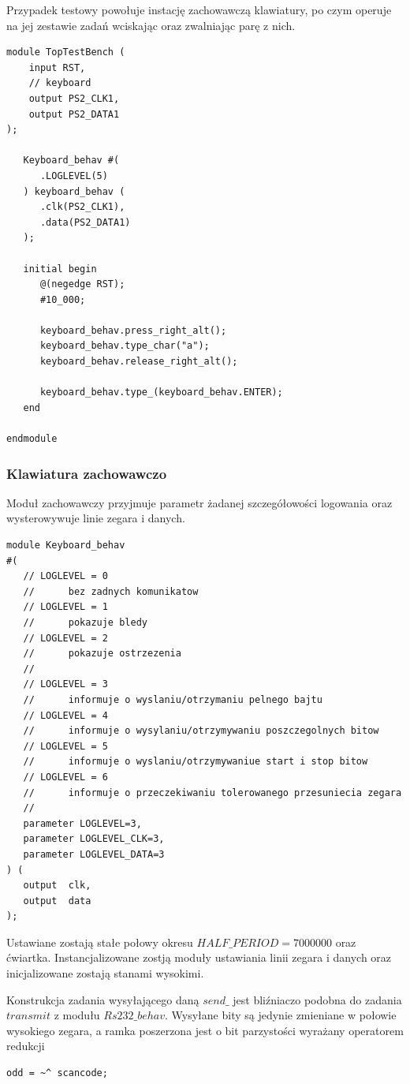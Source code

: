 \documentclass[a4paper,12pt]{article}
\begin{document}
Przypadek testowy powołuje instację zachowawczą klawiatury, po czym operuje na jej zestawie zadań wciskając oraz zwalniając parę z nich.
\begin{lstlisting}[label=TopTestBench,caption=TopTestBench.v]
module TopTestBench (
    input RST,
    // keyboard
    output PS2_CLK1,
    output PS2_DATA1
);

   Keyboard_behav #(
      .LOGLEVEL(5)
   ) keyboard_behav (
      .clk(PS2_CLK1),
      .data(PS2_DATA1)
   );

   initial begin
      @(negedge RST);
      #10_000;

      keyboard_behav.press_right_alt();
      keyboard_behav.type_char("a");
      keyboard_behav.release_right_alt();

      keyboard_behav.type_(keyboard_behav.ENTER);
   end

endmodule
\end{lstlisting}

\subsubsection{Klawiatura zachowawczo}

Moduł zachowawczy przyjmuje parametr żadanej szczegółowości logowania oraz wysterowywuje linie zegara i danych.

\begin{lstlisting}[label=Keyboard_behav,caption=Keyboard\_behav.v]
module Keyboard_behav
#(
   // LOGLEVEL = 0
   //      bez zadnych komunikatow
   // LOGLEVEL = 1
   //      pokazuje bledy
   // LOGLEVEL = 2
   //      pokazuje ostrzezenia
   //
   // LOGLEVEL = 3
   //      informuje o wyslaniu/otrzymaniu pelnego bajtu
   // LOGLEVEL = 4
   //      informuje o wysylaniu/otrzymywaniu poszczegolnych bitow
   // LOGLEVEL = 5
   //      informuje o wyslaniu/otrzymywaniue start i stop bitow
   // LOGLEVEL = 6
   //      informuje o przeczekiwaniu tolerowanego przesuniecia zegara
   //
   parameter LOGLEVEL=3,
   parameter LOGLEVEL_CLK=3,
   parameter LOGLEVEL_DATA=3
) (
   output  clk,
   output  data
);
\end{lstlisting}

Ustawiane zostają stałe połowy okresu $HALF\_PERIOD = 7 000 000$ oraz ćwiartka. Instancjalizowane zostją moduły ustawiania linii zegara i danych oraz inicjalizowane zostają stanami wysokimi.

Konstrukcja zadania wysyłającego daną $send\_$ jest bliźniaczo podobna do zadania $transmit$ z modułu $Rs232\_behav$. Wysyłane bity są jedynie zmieniane w połowie wysokiego zegara, a ramka poszerzona jest o bit parzystości wyrażany operatorem redukcji
\begin{lstlisting}[label=Keyboard_behav,caption=Keyboard\_behav.v,firstnumber=75]
	 odd = ~^ scancode;
\end{lstlisting}
\end{document}
